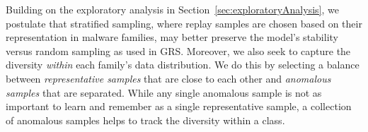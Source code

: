 Building on the exploratory analysis in Section~\ref{sec:exploratoryAnalysis}, we postulate that stratified sampling, where replay samples are chosen based on their representation in malware families, may better preserve the model's stability versus random sampling as used in GRS. Moreover, we also seek to capture the diversity \emph{within} each family's data distribution. 
We do this by selecting a balance between \emph{representative samples} that are close to each other and \emph{anomalous samples} that are separated. 
While any single anomalous sample is not as important to learn and remember as a single representative sample, a collection of anomalous samples helps to track the diversity within a class.




